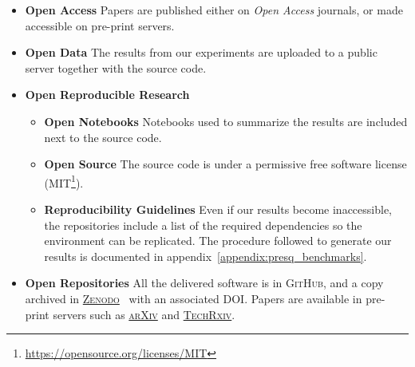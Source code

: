\begin{itemize}
    \item \textbf{Open Access} Papers are published either on \emph{Open Access} journals,
        or made accessible on pre-print servers.
    \item \textbf{Open Data} The results from our experiments are uploaded to a public server together with the source code.
    \item \textbf{Open Reproducible Research} 
        \begin{itemize}
            \item \textbf{Open Notebooks} Notebooks used to summarize the results are
                included next to the source code.
            \item \textbf{Open Source} The source code is under a permissive free software license
                (MIT\footnote{\url{https://opensource.org/licenses/MIT}}).
            \item \textbf{Reproducibility Guidelines} Even if our results become
            inaccessible, the repositories include a list of the required dependencies so the
            environment can be replicated. The procedure followed to generate our results is documented in appendix~\ref{appendix:presq_benchmarks}.
        \end{itemize}
    \item \textbf{Open Repositories} All the delivered software is in \textsc{GitHub},
        and a copy archived in \href{https://zenodo.org/}{\textsc{Zenodo}}~\cite{zenodo} with an
        associated DOI. Papers are available in pre-print servers such as
        \href{https://arxiv.org/}{\textsc{arXiv}} and
        \href{https://www.techrxiv.org}{\textsc{TechRxiv}}.
\end{itemize}
